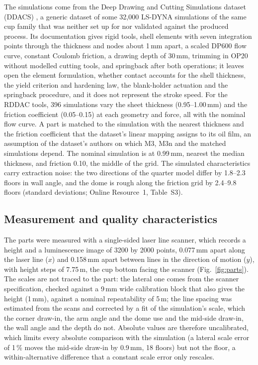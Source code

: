 \documentclass[pdflatex,sn-basic,lineno]{sn-jnl}
\newcommand{\ORt}[1]{Online Resource~1, Table~S#1}
\begin{document}
The simulations come from the Deep Drawing and Cutting Simulations dataset (DDACS) \citep{baum2025ddacs, heinzelmann2025comprehensive}, a generic dataset of some 32,000 LS-DYNA simulations of the same cup family that was neither set up for nor validated against the produced process. Its documentation gives rigid tools, shell elements with seven integration points through the thickness and nodes about 1\,mm apart, a scaled DP600 flow curve, constant Coulomb friction, a drawing depth of 30\,mm, trimming in OP20 without modelled cutting tools, and springback after both operations; it leaves open the element formulation, whether contact accounts for the shell thickness, the yield criterion and hardening law, the blank-holder actuation and the springback procedure, and it does not represent the stroke speed. For the RDDAC tools, 396 simulations vary the sheet thickness (0.95--1.00\,mm) and the friction coefficient (0.05--0.15) at each geometry and force, all with the nominal flow curve. A part is matched to the simulation with the nearest thickness and the friction coefficient that the dataset's linear mapping assigns to its oil film, an assumption of the dataset's authors on which M3, M3n and the matched simulations depend. The nominal simulation is at 0.99\,mm, nearest the median thickness, and friction 0.10, the middle of the grid. The simulated characteristics carry extraction noise: the two directions of the quarter model differ by 1.8--2.3 floors in wall angle, and the dome is rough along the friction grid by 2.4--9.8 floors (standard deviations; \ORt{3}).

\subsection{Measurement and quality characteristics}\label{sec:qcs}

The parts were measured with a single-sided laser line scanner, which records a height and a luminescence image of 3200 by 2000 points, 0.077\,mm apart along the laser line ($x$) and 0.158\,mm apart between lines in the direction of motion ($y$), with height steps of 7.75\,\textmu m, the cup bottom facing the scanner (Fig.~\ref{fig:parts}). The scales are not traced to the part: the lateral one comes from the scanner specification, checked against a 9\,mm wide calibration block that also gives the height (1\,mm), against a nominal repeatability of 5\,\textmu m; the line spacing was estimated from the scans and corrected by a fit of the simulation's scale, which the corner draw-in, the arm angle and the dome use and the mid-side draw-in, the wall angle and the depth do not. Absolute values are therefore uncalibrated, which limits every absolute comparison with the simulation (a lateral scale error of 1\,\% moves the mid-side draw-in by 0.9\,mm, 18 floors) but not the floor, a within-alternative difference that a constant scale error only rescales.
\end{document}
